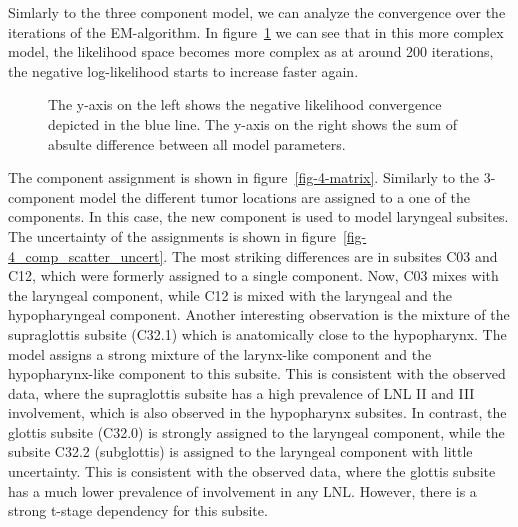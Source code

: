 \documentclass[
  sn-mathphys-num,
]{sn-jnl}
\begin{document}
Simlarly to the three component model, we can analyze the convergence
over the iterations of the EM-algorithm. In
figure~\ref{fig-convergence4} we can see that in this more complex
model, the likelihood space becomes more complex as at around 200
iterations, the negative log-likelihood starts to increase faster again.

\begin{figure}


\caption{\label{fig-convergence4}The y-axis on the left shows the
negative likelihood convergence depicted in the blue line. The y-axis on
the right shows the sum of absulte difference between all model
parameters.}

\end{figure}%

The component assignment is shown in figure~\ref{fig-4-matrix}.
Similarly to the 3-component model the different tumor locations are
assigned to a one of the components. In this case, the new component is
used to model laryngeal subsites. The uncertainty of the assignments is
shown in figure~\ref{fig-4_comp_scatter_uncert}. The most striking
differences are in subsites C03 and C12, which were formerly assigned to
a single component. Now, C03 mixes with the laryngeal component, while
C12 is mixed with the laryngeal and the hypopharyngeal component.
Another interesting observation is the mixture of the supraglottis
subsite (C32.1) which is anatomically close to the hypopharynx. The
model assigns a strong mixture of the larynx-like component and the
hypopharynx-like component to this subsite. This is consistent with the
observed data, where the supraglottis subsite has a high prevalence of
LNL II and III involvement, which is also observed in the hypopharynx
subsites. In contrast, the glottis subsite (C32.0) is strongly assigned
to the laryngeal component, while the subsite C32.2 (subglottis) is
assigned to the laryngeal component with little uncertainty. This is
consistent with the observed data, where the glottis subsite has a much
lower prevalence of involvement in any LNL. However, there is a strong
t-stage dependency for this subsite.
\end{document}
